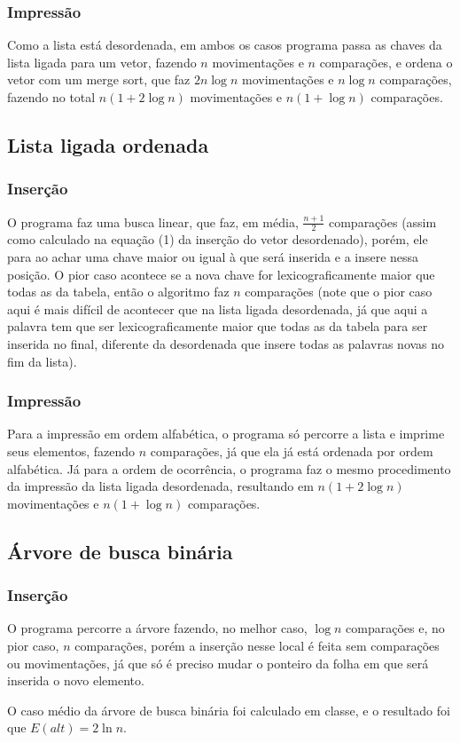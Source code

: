 \documentclass[12pt, a4paper]{article} %
\begin{document}
		\subsubsection{Impressão}
		\par Como a lista está desordenada, em ambos os casos programa passa as chaves da lista ligada para um vetor, fazendo $n$ movimentações e $n$ comparações, e ordena o vetor com um merge sort, que faz $2n\log n$ movimentações e $n\log n$ comparações, fazendo no total $n(1+2\log n)$ movimentações e $n(1+\log n)$ comparações.

	\subsection{Lista ligada ordenada}
		\subsubsection{Inserção}
		\par O programa faz uma busca linear, que faz, em média, $\frac{n+1}{2}$ comparações (assim como calculado na equação (1) da inserção do vetor desordenado), porém, ele para ao achar uma chave maior ou igual à que será inserida e a insere nessa posição. O pior caso acontece se a nova chave for lexicograficamente maior que todas as da tabela, então o algoritmo faz $n$ comparações (note que o pior caso aqui é mais difícil de acontecer que na lista ligada desordenada, já que aqui a palavra tem que ser lexicograficamente maior que todas as da tabela para ser inserida no final, diferente da desordenada que insere todas as palavras novas no fim da lista).
		\subsubsection{Impressão}
		\par Para a impressão em ordem alfabética, o programa só percorre a lista e imprime seus elementos, fazendo $n$ comparações, já que ela já está ordenada por ordem alfabética. Já para a ordem de ocorrência, o programa faz o mesmo procedimento da impressão da lista ligada desordenada, resultando em $n(1+2\log n)$ movimentações e $n(1+\log n)$ comparações.

	\subsection{Árvore de busca binária}
		\subsubsection{Inserção}
		\par O programa percorre a árvore fazendo, no melhor caso, $\log n$ comparações e, no pior caso, $n$ comparações, porém a inserção nesse local é feita sem comparações ou movimentações, já que só é preciso mudar o ponteiro da folha em que será inserida o novo elemento.
		\par O caso médio da árvore de busca binária foi calculado em classe, e o resultado foi que $E(alt) = 2\ln n$.
\end{document}
